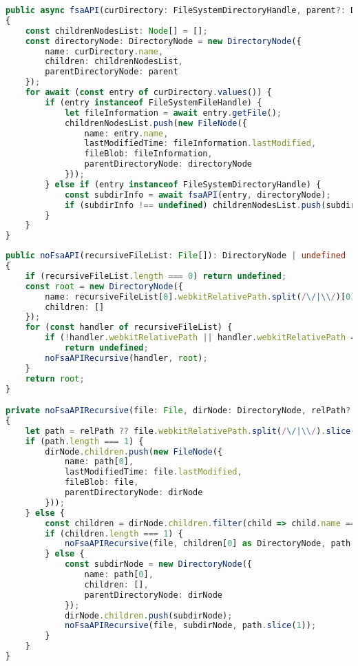 \begin{lstlisting}[language=TypeScript,caption={Método para el recorrido en profundidad de un directorio mediante la \textit{File System Access API}.},label=cod:sincroConFSA]
public async fsaAPI(curDirectory: FileSystemDirectoryHandle, parent?: DirectoryNode): Promise<DirectoryNode | undefined>
{
    const childrenNodesList: Node[] = [];
    const directoryNode: DirectoryNode = new DirectoryNode({
        name: curDirectory.name,
        children: childrenNodesList,
        parentDirectoryNode: parent
    });
    for await (const entry of curDirectory.values()) {
        if (entry instanceof FileSystemFileHandle) {
            let fileInformation = await entry.getFile();
            childrenNodesList.push(new FileNode({
                name: entry.name,
                lastModifiedTime: fileInformation.lastModified,
                fileBlob: fileInformation,
                parentDirectoryNode: directoryNode
            }));
        } else if (entry instanceof FileSystemDirectoryHandle) {
            const subdirInfo = await fsaAPI(entry, directoryNode);
            if (subdirInfo !== undefined) childrenNodesList.push(subdirInfo);
        }
    }
}
\end{lstlisting}

\begin{lstlisting}[language=TypeScript,caption={Procedimiento para la interpretación de la lista de ficheros obtenida mediante el \textit{ponyfill} como un árbol comparable.},label=cod:sincroSinFSA]
public noFsaAPI(recursiveFileList: File[]): DirectoryNode | undefined
{
    if (recursiveFileList.length === 0) return undefined;
    const root = new DirectoryNode({
        name: recursiveFileList[0].webkitRelativePath.split(/\/|\\/)[0],
        children: []
    });
    for (const handler of recursiveFileList) {
        if (!handler.webkitRelativePath || handler.webkitRelativePath === "")
            return undefined;
        noFsaAPIRecursive(handler, root);
    }
    return root;
}

private noFsaAPIRecursive(file: File, dirNode: DirectoryNode, relPath?: string[])
{
    let path = relPath ?? file.webkitRelativePath.split(/\/|\\/).slice(1);
    if (path.length === 1) {
        dirNode.children.push(new FileNode({
            name: path[0],
            lastModifiedTime: file.lastModified,
            fileBlob: file,
            parentDirectoryNode: dirNode
        }));
    } else {
        const children = dirNode.children.filter(child => child.name === path[0]);
        if (children.length === 1) {
            noFsaAPIRecursive(file, children[0] as DirectoryNode, path.slice(1));
        } else {
            const subdirNode = new DirectoryNode({
                name: path[0],
                children: [],
                parentDirectoryNode: dirNode
            });
            dirNode.children.push(subdirNode);
            noFsaAPIRecursive(file, subdirNode, path.slice(1));
        }
    }
}
\end{lstlisting}

